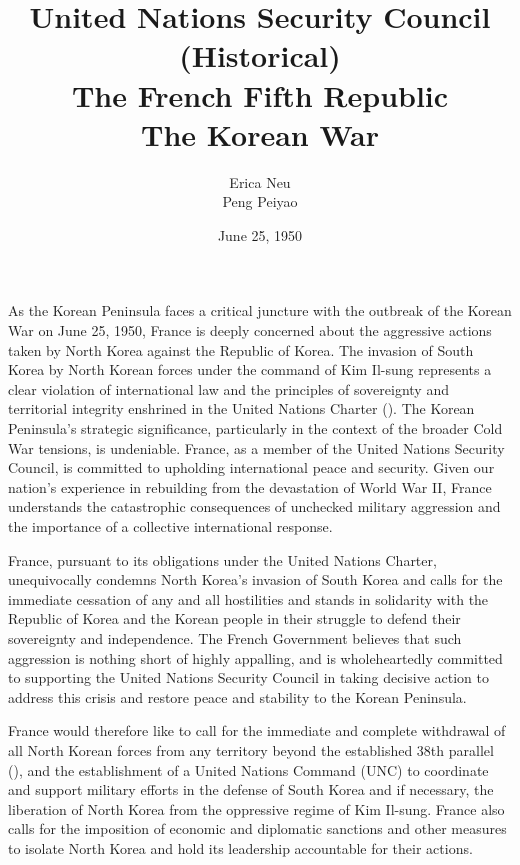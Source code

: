 \documentclass[a4paper,12pt]{article}
\title{
	\vspace{0.7in}
	United Nations Security Council (Historical)\\
	\vspace{1em}
	\textbf{The French Fifth Republic} \\
	\vspace{0.5em}
	\textbf{The Korean War}
	\vspace{4in}
}
\date{
	\vspace{0in}
	June 25, 1950
}
\author{
	Erica Neu\\ Peng Peiyao \\
}
\begin{document}
\maketitle

\clearpage


As the Korean Peninsula faces a critical juncture with the outbreak of the Korean War on June 25, 1950, France is deeply concerned about the aggressive actions taken by North Korea against the Republic of Korea. The invasion of South Korea by North Korean forces under the command of Kim Il-sung represents a clear violation of international law and the principles of sovereignty and territorial integrity enshrined in the United Nations Charter (\cite{nations_2023_united}). The Korean Peninsula's strategic significance, particularly in the context of the broader Cold War tensions, is undeniable. France, as a member of the United Nations Security Council, is committed to upholding international peace and security. Given our nation's experience in rebuilding from the devastation of World War II, France understands the catastrophic consequences of unchecked military aggression and the importance of a collective international response.

France, pursuant to its obligations under the United Nations Charter, unequivocally condemns North Korea's invasion of South Korea and calls for the immediate cessation of any and all hostilities and stands in solidarity with the Republic of Korea and the Korean people in their struggle to defend their sovereignty and independence. The French Government believes that such aggression is nothing short of highly appalling, and is wholeheartedly committed to supporting the United Nations Security Council in taking decisive action to address this crisis and restore peace and stability to the Korean Peninsula.

France would therefore like to call for the immediate and complete withdrawal of all North Korean forces from any territory beyond the established 38th parallel (\cite{thenationalendowmentforthehumanities_2019_korea}), and the establishment of a United Nations Command (UNC) to coordinate and support military efforts in the defense of South Korea and if necessary, the liberation of North Korea from the oppressive regime of Kim Il-sung. France also calls for the imposition of economic and diplomatic sanctions and other measures to isolate North Korea and hold its leadership accountable for their actions.
\end{document}
